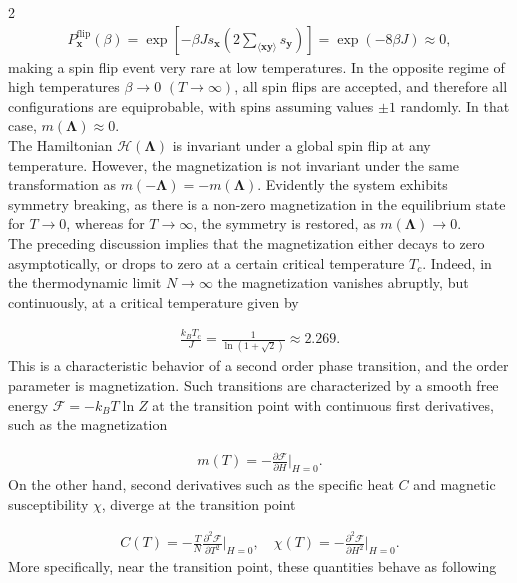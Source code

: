 \documentclass{article}
\begin{document}
\begin{multicols}{2}
\begin{align}
    P_{\mathbf{x}}^{\text{flip}}(\beta) 
    = \exp\left[-\beta Js_{\mathbf{x}}\left(2\sum_{\langle \mathbf{xy} \rangle}s_{\mathbf{y}}\right)\right]
    = \exp(-8\beta J) \approx 0,
\end{align}
%
making a spin flip event very rare at low temperatures. In the opposite regime of high temperatures $\beta \to 0$ $(T \to \infty)$, all spin flips are accepted, and therefore all configurations are equiprobable, with spins assuming values $\pm 1$ randomly. In that case, $m(\boldsymbol{\Lambda}) \approx 0$.\\

The Hamiltonian $\mathcal{H}(\boldsymbol{\Lambda})$ is invariant under a global spin flip at any temperature. However, the magnetization is not invariant under the same transformation as $m(-\boldsymbol{\Lambda}) = -m(\boldsymbol{\Lambda})$. Evidently the system exhibits symmetry breaking, as there is a non-zero magnetization in the equilibrium state for $T\to 0$, whereas for $T\to\infty$, the symmetry is restored, as $m(\boldsymbol{\Lambda}) \to 0$.\\

The preceding discussion implies that the magnetization either decays to zero asymptotically, or drops to zero at a certain critical temperature $T_c$. Indeed, in the thermodynamic limit $N \to \infty$ the magnetization vanishes abruptly, but continuously, at a critical temperature given by

\begin{align}
    \frac{k_BT_c}{J} = \frac{1}{\ln{(1+\sqrt{2})}} \approx 2.269.
\end{align}
%
This is a characteristic behavior of a second order phase transition, and the order parameter is magnetization. Such transitions are characterized by a smooth free energy $\mathcal{F} = -k_BT\ln{Z}$ at the transition point with continuous first derivatives, such as the magnetization

\begin{align}
    m(T) = -\frac{\partial \mathcal{F}}{\partial H}\Bigg|_{H=0}.
\end{align}
%
On the other hand, second derivatives such as the specific heat $C$ and magnetic susceptibility $\chi$, diverge at the transition point

\begin{align}
    C(T) = -\frac{T}{N}\frac{\partial^2\mathcal{F}}{\partial T^2}\Bigg|_{H=0},
    \quad
    \chi(T) = -\frac{\partial^2\mathcal{F}}{\partial H^2}\Bigg|_{H=0}.
\end{align}
%
More specifically, near the transition point, these quantities behave as following \cite{computational_book}


\end{multicols}
\end{document}
